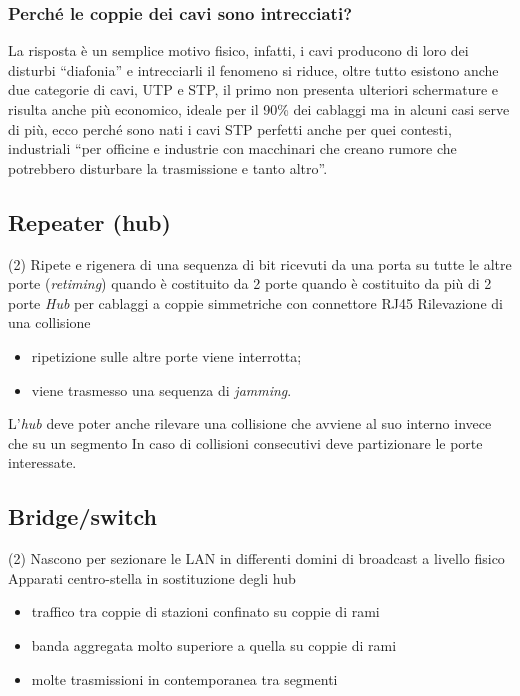 \documentclass{book}
\begin{document}
\subsubsection{Perché le coppie dei cavi sono intrecciati?}
La risposta è un semplice motivo fisico, infatti, i cavi producono di loro dei
disturbi ``diafonia'' e intrecciarli il fenomeno si riduce, oltre tutto
esistono anche due categorie di cavi, UTP e STP, il primo non presenta
ulteriori schermature e risulta anche più economico, ideale per il 90\% dei
cablaggi ma in alcuni casi serve di più, ecco perché sono nati i cavi STP
perfetti anche per quei contesti, industriali ``per officine e industrie con
macchinari che creano rumore che potrebbero disturbare la trasmissione e tanto
altro''.
\subsection{Repeater (hub)}
\begin{tasks}(2)
	\task Ripete e rigenera di una sequenza di bit ricevuti da una porta su tutte
	le altre porte (\textit{retiming})
	 quando è costituito da 2 porte
	 quando è costituito da più di 2 porte 
	\task \textit{Hub} per cablaggi a coppie simmetriche con connettore RJ45
	\task Rilevazione di una collisione
	\begin{itemize}
		\item ripetizione sulle altre porte viene interrotta;
		\item viene trasmesso una sequenza di \textit{jamming}.
	\end{itemize}
	\task L'\textit{hub} deve poter anche rilevare una collisione che avviene
	al suo interno invece che su un segmento
	\task In caso di collisioni consecutivi deve partizionare le porte
	interessate.
\end{tasks}
\subsection{Bridge/switch}
\begin{tasks}(2)
	\task Nascono per sezionare le LAN in differenti domini di broadcast a
	livello fisico
	\task Apparati centro-stella in sostituzione degli hub
	\begin{itemize}
		\item traffico tra coppie di stazioni confinato su coppie di rami
		\item banda aggregata molto superiore a quella su coppie di rami
		\item molte trasmissioni in contemporanea tra segmenti
	\end{itemize}
\end{tasks}
\end{document}
